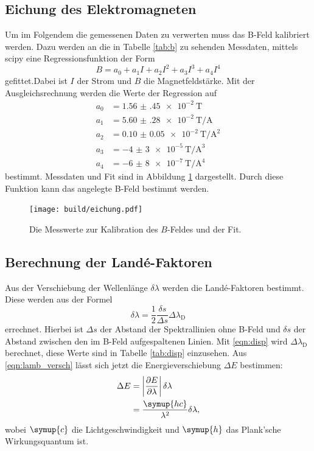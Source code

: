 \subsection{Eichung des Elektromagneten}
Um im Folgendem die gemessenen Daten zu verwerten muss das B-Feld kalibriert werden.
Dazu werden an die in Tabelle \ref{tab:b} zu sehenden Messdaten, mittels scipy \cite{scipy} eine Regressionsfunktion der Form 
\begin{equation*}
  B = a_0 + a_1I + a_2I^2 + a_3I^3 + a_4I^4
\end{equation*}
gefittet.Dabei ist $I$ der Strom und $B$ die Magnetfeldstärke.
Mit der Ausgleichsrechnung werden die Werte der Regression auf
\begin{align*}
  a_0&=\SI{1.56(45)e-2}{\tesla}\\
  a_1&=\SI{5.60(28)e-2}{\tesla\per\ampere}\\
  a_2&=\SI{0.10(5)e-2}{\tesla\per\ampere\squared}\\
  a_3&=\SI{-4(3)e-5}{\tesla\per\ampere\cubed}\\
  a_4&=\SI{-6(8)e-7}{\tesla\per\ampere\tothe{4}}
\end{align*}
bestimmt.
Messdaten und Fit sind in Abbildung \ref{fig:eichung} dargestellt.
Durch diese Funktion kann das angelegte B-Feld bestimmt werden.


\begin{figure}[htb]
  \centering
  \texttt{[image: build/eichung.pdf]}
  \caption{Die Messwerte zur Kalibration des $B$-Feldes und der Fit.}
  \label{fig:eichung}
\end{figure}
\FloatBarrier

\subsection{Berechnung der Landé-Faktoren}
Aus der Verschiebung der Wellenlänge $\delta\lambda$ werden die Landé-Faktoren bestimmt.
Diese werden aus der Formel
\begin{equation}
  \label{eqn:lamb_versch}
  \delta\lambda=\frac{1}{2}\frac{\delta s}{\Delta s}\Delta\lambda_\text{D}
\end{equation}
errechnet.
Hierbei ist $\Delta s$ der Abstand der Spektrallinien ohne B-Feld und $\delta s$ der Abstand zwischen den im B-Feld aufgespaltenen Linien.
Mit \eqref{eqn:disp} wird $\Delta\lambda_\text{D}$ berechnet, diese Werte sind in Tabelle \ref{tab:disp} einzusehen.
Aus \eqref{eqn:lamb_versch} lässt sich jetzt die Energieverschiebung $\Delta E$ bestimmen:
\begin{align}
  \label{eqn:DE}
  \Delta E &= \left |\frac{\partial E}{\partial \lambda}\right |\delta \lambda\nonumber\\
  &=\frac{\symup{hc}}{\lambda^2}\delta\lambda,
\end{align}
wobei $\symup{c}$ die Lichtgeschwindigkeit und $\symup{h}$ das Plank'sche Wirkungsquantum ist.



